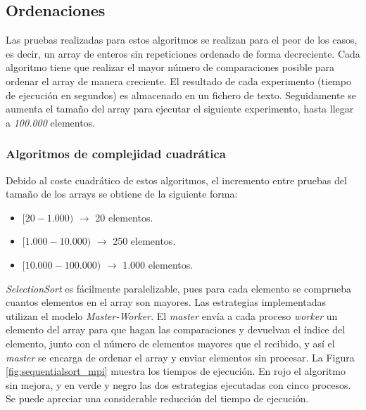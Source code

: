 \subsection{Ordenaciones}

Las pruebas realizadas para estos algoritmos se realizan para el peor de los casos, es decir, un array de enteros sin repeticiones ordenado de forma decreciente. Cada algoritmo tiene que realizar el mayor número de comparaciones posible para ordenar el array de manera creciente. El resultado de cada experimento (tiempo de ejecución en segundos) es almacenado en un fichero de texto. Seguidamente se aumenta el tamaño del array para ejecutar el siguiente experimento, hasta llegar a \textit{100.000} elementos.	

\subsubsection{Algoritmos de complejidad cuadrática}		
\label{cap:4_2_1_1}

Debido al coste cuadrático de estos algoritmos, el incremento entre pruebas del tamaño de los arrays se obtiene de la siguiente forma:
\begin{itemize}
	\vspace*{-0.2cm}	
	\item \([20-1.000)\) $\rightarrow$ 20 elementos.
	\vspace*{-0.4cm}	
	\item \([1.000-10.000)\) $\rightarrow$ 250 elementos.
	\vspace*{-0.4cm}	
	\item \([10.000-100.000)\) $\rightarrow$ 1.000 elementos.					
\end{itemize}



\textit{SelectionSort} es fácilmente paralelizable, pues para cada elemento se comprueba cuantos elementos en el array son mayores. Las estrategias implementadas utilizan el modelo \textit{Master-Worker}. El \textit{master} envía a cada proceso \textit{worker} un elemento del array para que hagan las comparaciones y devuelvan el índice del elemento, junto con el número de elementos mayores que el recibido, y así el \textit{master} se encarga de ordenar el array y enviar elementos sin procesar. La Figura \ref{fig:sequentialsort_mpi} muestra los tiempos de ejecución. En rojo el algoritmo sin mejora, y en verde y negro las dos estrategias ejecutadas con cinco procesos. Se puede apreciar una considerable reducción del tiempo de ejecución. 

